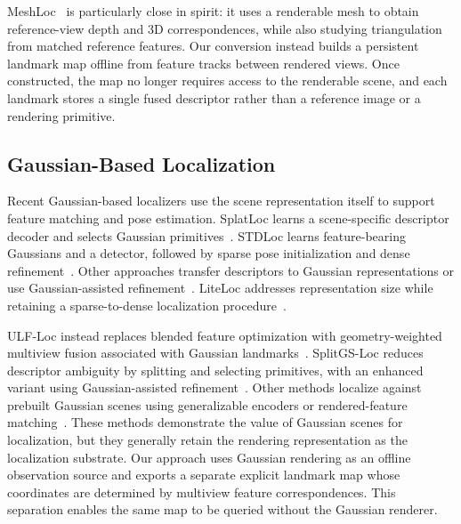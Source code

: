 MeshLoc~\cite{panek2022meshloc} is particularly close in spirit: it uses a renderable mesh to obtain reference-view depth and 3D correspondences, while also studying triangulation from matched reference features. Our conversion instead builds a persistent landmark map offline from feature tracks between rendered views. Once constructed, the map no longer requires access to the renderable scene, and each landmark stores a single fused descriptor rather than a reference image or a rendering primitive.

\subsection{Gaussian-Based Localization}
Recent Gaussian-based localizers use the scene representation itself to support feature matching and pose estimation. SplatLoc learns a scene-specific descriptor decoder and selects Gaussian primitives~\cite{zhai2025splatloc}. STDLoc learns feature-bearing Gaussians and a detector, followed by sparse pose initialization and dense refinement~\cite{huang2025stdloc}. Other approaches transfer descriptors to Gaussian representations or use Gaussian-assisted refinement~\cite{reported260504730v1bibbib47,reported260504730v1bibbib52,reported260504730v1bibbib61}. LiteLoc addresses representation size while retaining a sparse-to-dense localization procedure~\cite{li2026liteloc}.

ULF-Loc instead replaces blended feature optimization with geometry-weighted multiview fusion associated with Gaussian landmarks~\cite{gu2026ulfloc}. SplitGS-Loc reduces descriptor ambiguity by splitting and selecting primitives, with an enhanced variant using Gaussian-assisted refinement~\cite{lee2026splitgsloc}. Other methods localize against prebuilt Gaussian scenes using generalizable encoders or rendered-feature matching~\cite{khatib2025gsvisloc,lee2025gsfeatloc}. These methods demonstrate the value of Gaussian scenes for localization, but they generally retain the rendering representation as the localization substrate. Our approach uses Gaussian rendering as an offline observation source and exports a separate explicit landmark map whose coordinates are determined by multiview feature correspondences. This separation enables the same map to be queried without the Gaussian renderer.